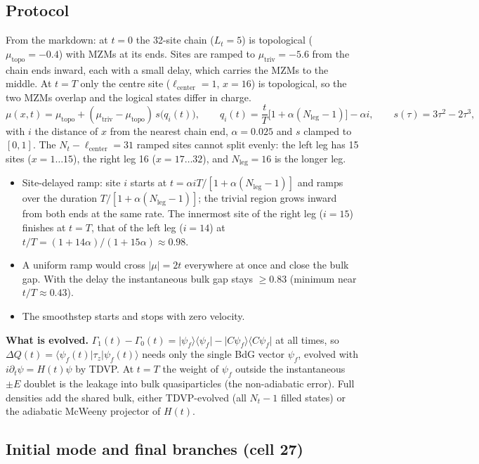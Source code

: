 \documentclass[11pt]{article}
\newcommand{\ket}[1]{\lvert #1\rangle}
\newcommand{\bra}[1]{\langle #1\rvert}
\begin{document}
\subsection{Protocol}
From the markdown: at $t=0$ the 32-site chain ($L_t=5$) is topological ($\mu_{\text{topo}}=-0.4$) with MZMs at its
ends. Sites are ramped to $\mu_{\text{triv}}=-5.6$ from the chain ends inward, each with a small delay, which carries
the MZMs to the middle. At $t=T$ only the centre site ($\ell_{\text{center}}=1$, $x=16$) is topological, so the two
MZMs overlap and the logical states differ in charge.
\[
  \mu(x,t) = \mu_{\text{topo}} + (\mu_{\text{triv}}-\mu_{\text{topo}})\,s\bigl(q_i(t)\bigr),\qquad
  q_i(t) = \frac tT\bigl[1+\alpha(N_{\text{leg}}-1)\bigr]-\alpha i,\qquad
  s(\tau)=3\tau^2-2\tau^3 ,
\]
with $i$ the distance of $x$ from the nearest chain end, $\alpha=0.025$ and $s$ clamped to $[0,1]$. The
$N_t-\ell_{\text{center}}=31$ ramped sites cannot split evenly: the left leg has 15 sites ($x=1\dots15$), the right leg 16
($x=17\dots32$), and $N_{\text{leg}}=16$ is the longer leg.
\begin{itemize}
\item Site-delayed ramp: site $i$ starts at $t=\alpha iT/[1+\alpha(N_{\text{leg}}-1)]$ and ramps over the duration
      $T/[1+\alpha(N_{\text{leg}}-1)]$; the trivial region grows inward from both ends at the same rate. The innermost site
      of the right leg ($i=15$) finishes at $t=T$, that of the left leg ($i=14$) at $t/T=(1+14\alpha)/(1+15\alpha)\approx0.98$.
\item A uniform ramp would cross $|\mu|=2t$ everywhere at once and close the bulk gap. With the delay the instantaneous
      bulk gap stays $\ge0.83$ (minimum near $t/T\approx0.43$).
\item The smoothstep starts and stops with zero velocity.
\end{itemize}
\textbf{What is evolved.} $\Gamma_1(t)-\Gamma_0(t) = \ket{\psi_f}\bra{\psi_f}-\ket{C\psi_f}\bra{C\psi_f}$ at all times,
so $\Delta Q(t)=\bra{\psi_f(t)}\tau_z\ket{\psi_f(t)}$ needs only the single BdG vector $\psi_f$, evolved with
$i\partial_t\psi=H(t)\psi$ by TDVP. At $t=T$ the weight of $\psi_f$ outside the instantaneous $\pm E$ doublet is the
leakage into bulk quasiparticles (the non-adiabatic error). Full densities add the shared bulk, either TDVP-evolved
(all $N_t-1$ filled states) or the adiabatic McWeeny projector of $H(t)$.

\subsection{Initial mode and final branches (cell 27)}
\end{document}
